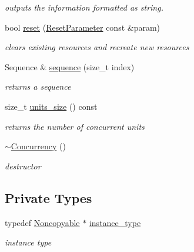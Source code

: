 \begin{DoxyCompactItemize}
\begin{DoxyCompactList}\small\item\em outputs the information formatted as string. \end{DoxyCompactList}\item 
bool \hyperlink{classhryky_1_1task_1_1_concurrency_aa81eeaa909ee4abde16a1619da5c011d}{reset} (\hyperlink{structhryky_1_1task_1_1_concurrency_1_1_reset_parameter}{Reset\-Parameter} const \&param)
\begin{DoxyCompactList}\small\item\em clears existing resources and recreate new resources \end{DoxyCompactList}\item 
Sequence \& \hyperlink{classhryky_1_1task_1_1_concurrency_aa82281dbb7df8aa9fcad2acb9ecb4531}{sequence} (size\-\_\-t index)
\begin{DoxyCompactList}\small\item\em returns a sequence \end{DoxyCompactList}\item 
size\-\_\-t \hyperlink{classhryky_1_1task_1_1_concurrency_a2def26af9d687f558bbdb77f8c59f142}{units\-\_\-size} () const 
\begin{DoxyCompactList}\small\item\em returns the number of concurrent units \end{DoxyCompactList}\item 
\hyperlink{classhryky_1_1task_1_1_concurrency_af31a03465d7ffd79dbd47aea5cc0f1f6}{$\sim$\-Concurrency} ()
\begin{DoxyCompactList}\small\item\em destructor \end{DoxyCompactList}\end{DoxyCompactItemize}
\subsection*{Private Types}
\begin{DoxyCompactItemize}
\item 
\hypertarget{classhryky_1_1_noncopyable_aaf87abb55f700af85ecb0895f6178821}{typedef \hyperlink{classhryky_1_1_noncopyable}{Noncopyable} $\ast$ \hyperlink{classhryky_1_1_noncopyable_aaf87abb55f700af85ecb0895f6178821}{instance\-\_\-type}}\label{classhryky_1_1_noncopyable_aaf87abb55f700af85ecb0895f6178821}

\begin{DoxyCompactList}\small\item\em instance type \end{DoxyCompactList}\end{DoxyCompactItemize}


